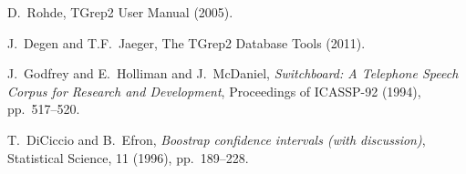 \documentclass{pnastwo}
\begin{document}
\begin{article}
\begin{thebibliography}{10}
	D.~Rohde, TGrep2 User Manual (2005).
	
	J.~Degen and T.F.~Jaeger, The TGrep2 Database Tools (2011).
	
	J.~Godfrey and E.~Holliman and J.~McDaniel, {\em Switchboard: A Telephone Speech Corpus for Research and Development}, Proceedings of ICASSP-92 (1994),
	pp.~517--520.
	
	T.~DiCiccio and B.~Efron, {\em Boostrap confidence intervals (with discussion)}, Statistical Science, 11 (1996), pp.~189--228.
\end{thebibliography}


\end{article}
\end{document}
